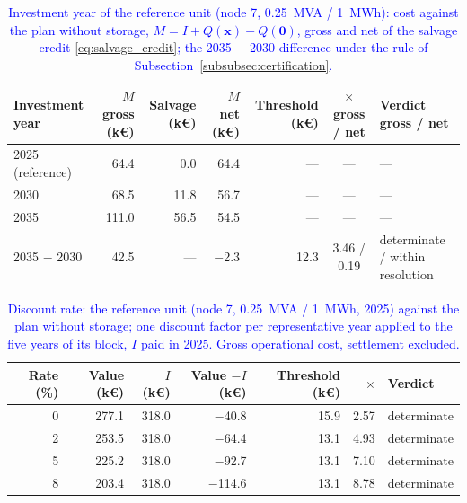 \begin{table}[htbp!]
    \centering
    \caption{\textcolor{blue}{Investment year of the reference unit (node 7, 0.25~MVA / 1~MWh): cost against the plan without storage, $M = I + Q(\boldsymbol{x}) - Q(\boldsymbol{0})$, gross and net of the salvage credit \eqref{eq:salvage_credit}; the 2035 $-$ 2030 difference under the rule of Subsection~\ref{subsubsec:certification}.}}
    \label{tab:res_year_ladder}
    \scriptsize\setlength{\tabcolsep}{4pt}
    \begin{tabular}{l r r r r c l}
        \toprule
        Investment year & $M$ gross (k\euro) & Salvage (k\euro) & $M$ net (k\euro) & Threshold (k\euro) & $\times$ gross / net & Verdict gross / net \\
        \midrule
        2025 (reference) & 64.4  & 0.0  & 64.4 & --- & --- & --- \\
        2030             & 68.5  & 11.8 & 56.7 & --- & --- & --- \\
        2035             & 111.0 & 56.5 & 54.5 & --- & --- & --- \\
        2035 $-$ 2030    & 42.5  & ---  & $-$2.3 & 12.3 & 3.46 / 0.19 & determinate / within resolution \\
        \bottomrule
    \end{tabular}
\end{table}

\begin{table}[htbp!]
    \centering
    \caption{\textcolor{blue}{Discount rate: the reference unit (node 7, 0.25~MVA / 1~MWh, 2025) against the plan without storage; one discount factor per representative year applied to the five years of its block, $I$ paid in 2025. Gross operational cost, settlement excluded.}}
    \label{tab:res_discount}
    \scriptsize\setlength{\tabcolsep}{4pt}
    \begin{tabular}{r r r r r r l}
        \toprule
        Rate (\%) & Value (k\euro) & $I$ (k\euro) & Value $- I$ (k\euro) & Threshold (k\euro) & $\times$ & Verdict \\
        \midrule
        0 & 277.1 & 318.0 & $-$40.8  & 15.9 & 2.57 & determinate \\
        2 & 253.5 & 318.0 & $-$64.4  & 13.1 & 4.93 & determinate \\
        5 & 225.2 & 318.0 & $-$92.7  & 13.1 & 7.10 & determinate \\
        8 & 203.4 & 318.0 & $-$114.6 & 13.1 & 8.78 & determinate \\
        \bottomrule
    \end{tabular}
\end{table}

